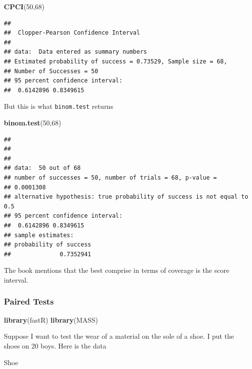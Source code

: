 \documentclass[]{book}
\newenvironment{Shaded}{\begin{snugshade}}{\end{snugshade}}
\newcommand{\KeywordTok}[1]{\textcolor[rgb]{0.13,0.29,0.53}{\textbf{#1}}}
\newcommand{\DecValTok}[1]{\textcolor[rgb]{0.00,0.00,0.81}{#1}}
\newcommand{\NormalTok}[1]{#1}
\theoremstyle{definition}
\theoremstyle{definition}
\theoremstyle{definition}
\theoremstyle{remark}
\begin{document}
\begin{Shaded}
\begin{Highlighting}[]
\KeywordTok{CPCI}\NormalTok{(}\DecValTok{50}\NormalTok{,}\DecValTok{68}\NormalTok{)}
\end{Highlighting}
\end{Shaded}

\begin{verbatim}
## 
##  Clopper-Pearson Confidence Interval
## 
## data:  Data entered as summary numbers
## Estimated probability of success = 0.73529, Sample size = 68,
## Number of Successes = 50
## 95 percent confidence interval:
##  0.6142896 0.8349615
\end{verbatim}

But this is what \texttt{binom.test} returns

\begin{Shaded}
\begin{Highlighting}[]
\KeywordTok{binom.test}\NormalTok{(}\DecValTok{50}\NormalTok{,}\DecValTok{68}\NormalTok{)}
\end{Highlighting}
\end{Shaded}

\begin{verbatim}
## 
## 
## 
## data:  50 out of 68
## number of successes = 50, number of trials = 68, p-value =
## 0.0001308
## alternative hypothesis: true probability of success is not equal to 0.5
## 95 percent confidence interval:
##  0.6142896 0.8349615
## sample estimates:
## probability of success 
##              0.7352941
\end{verbatim}

The book mentions that the best comprise in terms of coverage is the
score interval.

\subsubsection{Paired Tests}\label{paired-tests}

\begin{Shaded}
\begin{Highlighting}[]
\KeywordTok{library}\NormalTok{(fastR)}
\KeywordTok{library}\NormalTok{(MASS)}
\end{Highlighting}
\end{Shaded}

Suppose I want to test the wear of a material on the sole of a shoe. I
put the shoes on 20 boys. Here is the data

\begin{Shaded}
\begin{Highlighting}[]
\NormalTok{Shoe}
\end{Highlighting}
\end{Shaded}
\end{document}
